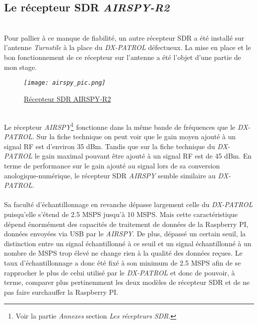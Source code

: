 \documentclass[12pt,fleqn]{book} %
\begin{document}
\subsection{Le récepteur SDR \emph{AIRSPY-R2}}
~\\Pour pallier à ce manque de fiabilité, un autre récepteur SDR a été installé sur l'antenne \emph{Turnstile} à la place du \emph{DX-PATROL} défectueux. La mise en place et le bon fonctionnement de ce récepteur sur l'antenne a été l'objet d'une partie de mon stage.
\begin{figure}[H]
	\centering
	\itshape
	\texttt{[image: airspy\_pic.png]}
	\caption{\label{airspy_pic} \underline{Récepteur SDR AIRSPY-R2}}
\end{figure}
~\\\noindent Le récepteur \emph{AIRSPY}\footnote{Voir la partie \emph{Annexes} section \emph{Les récepteurs SDR}.} fonctionne dans la même bande de fréquences que le \emph{DX-PATROL}. Sur la fiche technique on peut voir que le gain moyen ajouté à un signal RF est d'environ 35 dBm. Tandis que sur la fiche technique du \emph{DX-PATROL} le gain maximal pouvant être ajouté à un signal RF est de 45 dBm.
En terme de performance sur le gain ajouté au signal lors de sa conversion anologique-numérique, le récepteur SDR \emph{AIRSPY} semble similaire au \emph{DX-PATROL}.
~\\\\Sa faculté d'échantillonnage en revanche dépasse largement celle du \emph{DX-PATROL} puisqu'elle s'étend de 2.5 MSPS jusqu'à 10 MSPS. Mais cette caractéristique dépend énormément des capacités de traitement de données de la Raspberry PI, données envoyées via USB par le \emph{AIRSPY}. De plus, dépassé un certain seuil, la distinction entre un signal échantillonné à ce seuil et un signal échantillonné à un nombre de MSPS trop élevé ne change rien à la qualité des données reçues.
Le taux d'échantillonnage a donc été fixé à son minimum de 2.5 MSPS afin de se rapprocher le plus de celui utilisé par le \emph{DX-PATROL} et donc de pouvoir, à terme, comparer plus pertinemment les deux modèles de récepteur SDR et de ne pas faire surchauffer la Raspberry PI.
\end{document}
